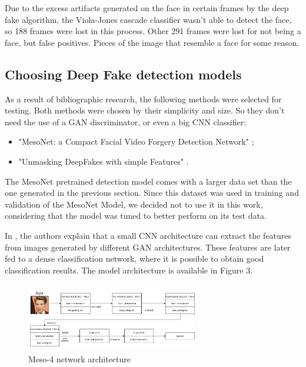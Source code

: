 \documentclass{bmvc2k}
\begin{document}
Due to the excess artifacts generated on the face in certain frames by the deep fake algorithm, the Viola-Jones cascade classifier wasn't able to detect the face, so 188 frames were lost in this process. Other 291 frames were lost for not being a face, but false positives. Pieces of the image that resemble a face for some reason.

\subsection{Choosing Deep Fake detection models}

As a result of bibliographic research, the following methods were selected for testing. Both methods were chosen by their simplicity and size. So they don't need the use of a GAN discriminator, or even a big CNN classifier:

\begin{itemize}
  \item "MesoNet: a Compact Facial Video Forgery Detection Network" \cite{journals/corr/abs-1809-00888};
  \item "Unmasking DeepFakes with simple Features" \cite{durall2019unmasking}.
\end{itemize}


The MesoNet pretrained detection model comes with a larger data set than the one generated in the previous section. Since this dataset was used in training and validation of the MesoNet Model, we decided not to use it in this work, considering that the model was tuned to better perform on its test data.

In \cite{journals/corr/abs-1809-00888}, the authors explain that a small CNN architecture can extract the features from images generated by different GAN architectures. These features are later fed to a dense classification network, where it is possible to obtain good classification results. The model architecture is available in Figure 3.

\begin{figure}[!h]
\centering
\includegraphics[width=7.5cm, height=3.0cm]{mesonet.png}
    \caption{Meso-4 network architecture}
\end{figure}
\end{document}
